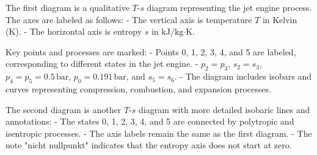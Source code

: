 The first diagram is a qualitative \( T \)-\( s \) diagram representing the jet engine process. The axes are labeled as follows:  
- The vertical axis is temperature \( T \) in Kelvin (K).  
- The horizontal axis is entropy \( s \) in \( \text{kJ}/\text{kg·K} \).  

Key points and processes are marked:  
- Points 0, 1, 2, 3, 4, and 5 are labeled, corresponding to different states in the jet engine.  
- \( p_2 = p_3 \), \( s_2 = s_3 \), \( p_4 = p_5 = 0.5 \, \text{bar} \), \( p_0 = 0.191 \, \text{bar} \), and \( s_5 = s_6 \).  
- The diagram includes isobars and curves representing compression, combustion, and expansion processes.  

The second diagram is another \( T \)-\( s \) diagram with more detailed isobaric lines and annotations:  
- The states 0, 1, 2, 3, 4, and 5 are connected by polytropic and isentropic processes.  
- The axis labels remain the same as the first diagram.  
- The note "nicht nullpunkt" indicates that the entropy axis does not start at zero.